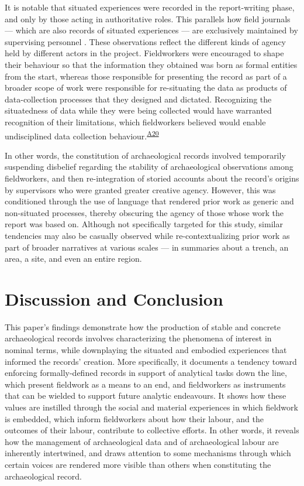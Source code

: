 \documentclass{article}
\begin{document}
It is notable that situated experiences were recorded in the
report-writing phase, and only by those acting in authoritative roles.
This parallels how field journals --- which are also records of situated
experiences --- are exclusively maintained by supervising personnel
\parencite{batist2024a}. These observations reflect the different kinds
of agency held by different actors in the project. Fieldworkers were
encouraged to shape their behaviour so that the information they
obtained was born as formal entities from the start, whereas those
responsible for presenting the record as part of a broader scope of work
were responsible for re-situating the data as products of
data-collection processes that they designed and dictated. Recognizing
the situatedness of data while they were being collected would have
warranted recognition of their limitations, which fieldworkers believed
would enable undisciplined data collection
behaviour.\textsuperscript{\hyperref[sec-A20]{A20}}

In other words, the constitution of archaeological records involved
temporarily suspending disbelief regarding the stability of
archaeological observations among fieldworkers, and then re-integration
of storied accounts about the record's origins by supervisors who were
granted greater creative agency. However, this was conditioned through
the use of language that rendered prior work as generic and non-situated
processes, thereby obscuring the agency of those whose work the report
was based on. Although not specifically targeted for this study, similar
tendencies may also be casually observed while re-contextualizing prior
work as part of broader narratives at various scales --- in summaries
about a trench, an area, a site, and even an entire region.


\section{Discussion and Conclusion}\label{discussion-and-conslusion}

This paper's findings demonstrate how the production of stable and
concrete archaeological records involves characterizing the phenomena of
interest in nominal terms, while downplaying the situated and embodied
experiences that informed the records' creation. More specifically, it
documents a tendency toward enforcing formally-defined records in
support of analytical tasks down the line, which present fieldwork as a
means to an end, and fieldworkers as instruments that can be wielded to
support future analytic endeavours. It shows how these values are
instilled through the social and material experiences in which fieldwork
is embedded, which inform fieldworkers about how their labour, and the
outcomes of their labour, contribute to collective efforts. In other
words, it reveals how the management of archaeological data and of
archaeological labour are inherently intertwined, and draws attention to
some mechanisms through which certain voices are rendered more visible
than others when constituting the archaeological record.
\end{document}
